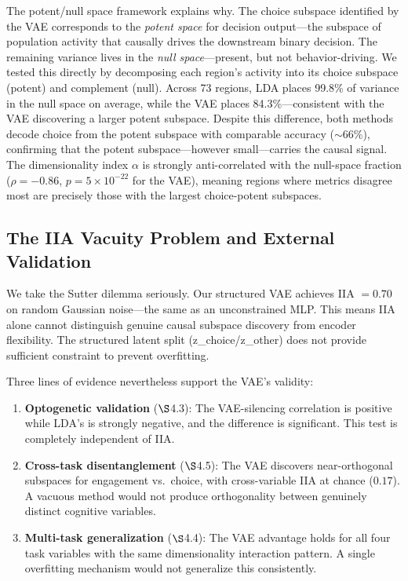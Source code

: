 \documentclass{article}
\begin{document}
The potent/null space framework \citep{kaufman2014cortical} explains why. The choice subspace identified by the VAE corresponds to the \emph{potent space} for decision output---the subspace of population activity that causally drives the downstream binary decision. The remaining variance lives in the \emph{null space}---present, but not behavior-driving. We tested this directly by decomposing each region's activity into its choice subspace (potent) and complement (null). Across 73 regions, LDA places 99.8\% of variance in the null space on average, while the VAE places 84.3\%---consistent with the VAE discovering a larger potent subspace. Despite this difference, both methods decode choice from the potent subspace with comparable accuracy ($\sim$66\%), confirming that the potent subspace---however small---carries the causal signal. The dimensionality index $\alpha$ is strongly anti-correlated with the null-space fraction ($\rho = -0.86$, $p = 5 \times 10^{-22}$ for the VAE), meaning regions where metrics disagree most are precisely those with the largest choice-potent subspaces.

\subsection{The IIA Vacuity Problem and External Validation}

We take the Sutter dilemma seriously. Our structured VAE achieves IIA $= 0.70$ on random Gaussian noise---the same as an unconstrained MLP. This means IIA alone cannot distinguish genuine causal subspace discovery from encoder flexibility. The structured latent split (z\_choice/z\_other) does not provide sufficient constraint to prevent overfitting.

Three lines of evidence nevertheless support the VAE's validity:

\begin{enumerate}
\item \textbf{Optogenetic validation} ($\S$4.3): The VAE-silencing correlation is positive while LDA's is strongly negative, and the difference is significant. This test is completely independent of IIA.
\item \textbf{Cross-task disentanglement} ($\S$4.5): The VAE discovers near-orthogonal subspaces for engagement vs.\ choice, with cross-variable IIA at chance ($0.17$). A vacuous method would not produce orthogonality between genuinely distinct cognitive variables.
\item \textbf{Multi-task generalization} ($\S$4.4): The VAE advantage holds for all four task variables with the same dimensionality interaction pattern. A single overfitting mechanism would not generalize this consistently.
\end{enumerate}
\end{document}
